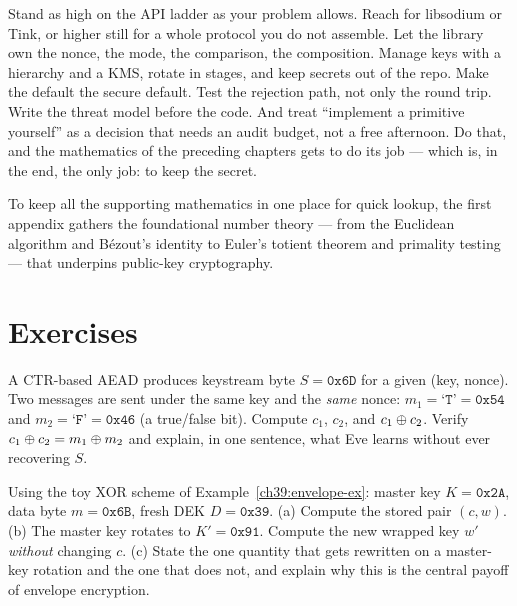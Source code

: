 Stand as high on the API ladder as your problem allows. Reach for libsodium or
Tink, or higher still for a whole protocol you do not assemble. Let the library
own the nonce, the mode, the comparison, the composition. Manage keys with a
hierarchy and a KMS, rotate in stages, and keep secrets out of the repo. Make the
default the secure default. Test the rejection path, not only the round trip. Write
the threat model before the code. And treat ``implement a primitive yourself'' as a
decision that needs an audit budget, not a free afternoon. Do that, and the
mathematics of the preceding chapters gets to do its job ---
which is, in the end, the only job: to keep the secret.

To keep all the supporting mathematics in one place for quick lookup, the first appendix gathers the foundational number theory --- from the Euclidean algorithm and B{\'e}zout's identity to Euler's totient theorem and primality testing --- that underpins public-key cryptography.

\section*{Exercises}

\begin{exercise}
A CTR-based AEAD produces keystream byte $S = \texttt{0x6D}$ for a given
(key, nonce). Two messages are sent under the same key and the \emph{same} nonce:
$m_1 = \text{`}\texttt{T}\text{'} = \texttt{0x54}$ and
$m_2 = \text{`}\texttt{F}\text{'} = \texttt{0x46}$ (a true/false bit). Compute
$c_1$, $c_2$, and $c_1 \oplus c_2$. Verify $c_1 \oplus c_2 = m_1 \oplus m_2$ and explain,
in one sentence, what Eve learns without ever recovering $S$.
\end{exercise}

\begin{exercise}
Using the toy XOR scheme of Example~\ref{ch39:envelope-ex}: master key
$K = \texttt{0x2A}$, data byte $m = \texttt{0x6B}$, fresh DEK $D = \texttt{0x39}$.
(a) Compute the stored pair $(c, w)$. (b) The master key rotates to
$K' = \texttt{0x91}$. Compute the new wrapped key $w'$ \emph{without} changing $c$.
(c) State the one quantity that gets rewritten on a master-key rotation and the one
that does not, and explain why this is the central payoff of envelope encryption.
\end{exercise}

